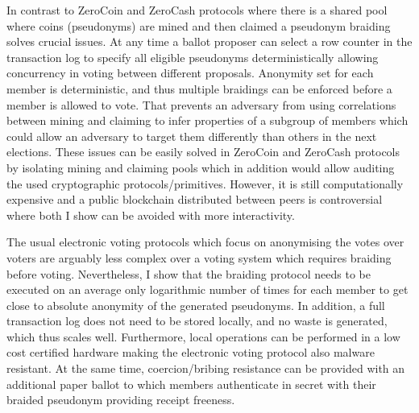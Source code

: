 \documentclass[12pt]{article}
\begin{document}
In contrast to ZeroCoin and ZeroCash protocols where there is a shared pool where coins (pseudonyms) are mined and then claimed a pseudonym braiding solves crucial issues. At any time a ballot proposer can select a row counter in the transaction log to specify all eligible pseudonyms deterministically allowing concurrency in voting between different proposals. Anonymity set for each member is deterministic, and thus multiple braidings can be enforced before a member is allowed to vote. That prevents an adversary from using correlations between mining and claiming to infer properties of a subgroup of members which could allow an adversary to target them differently than others in the next elections. These issues can be easily solved in ZeroCoin and ZeroCash protocols by isolating mining and claiming pools which in addition would allow auditing the used cryptographic protocols/primitives. However, it is still computationally expensive and a public blockchain distributed between peers is controversial where both I show can be avoided with more interactivity.

The usual electronic voting protocols which focus on anonymising the votes over voters are arguably less complex over a voting system which requires braiding before voting. Nevertheless, I show that the braiding protocol needs to be executed on an average only logarithmic number of times for each member to get close to absolute anonymity of the generated pseudonyms. In addition, a full transaction log does not need to be stored locally, and no waste is generated, which thus scales well. Furthermore, local operations can be performed in a low cost certified hardware making the electronic voting protocol also malware resistant. At the same time, coercion/bribing resistance can be provided with an additional paper ballot to which members authenticate in secret with their braided pseudonym providing receipt freeness.


\end{document}
